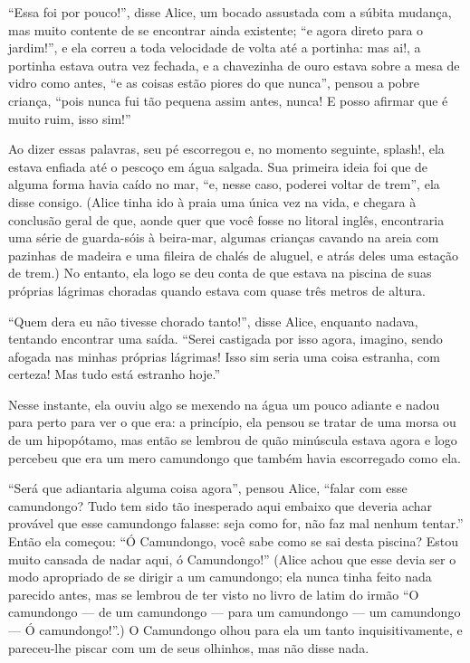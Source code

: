 ``Essa foi por pouco!'', disse Alice, um bocado assustada com a súbita
mudança, mas muito contente de se encontrar ainda existente; ``e agora
direto para o jardim!'', e ela correu a toda velocidade de volta até a
portinha: mas ai!, a portinha estava outra vez fechada, e a chavezinha
de ouro estava sobre a mesa de vidro como antes, ``e as coisas estão
piores do que nunca'', pensou a pobre criança, ``pois nunca fui tão
pequena assim antes, nunca! E posso afirmar que é muito ruim, isso
sim!''

Ao dizer essas palavras, seu pé escorregou e, no momento seguinte,
splash!, ela estava enfiada até o pescoço em água salgada. Sua primeira
ideia foi que de alguma forma havia caído no mar, ``e, nesse caso,
poderei voltar de trem'', ela disse consigo. (Alice tinha ido à praia
uma única vez na vida, e chegara à conclusão geral de que, aonde quer
que você fosse no litoral inglês, encontraria uma série de guarda-sóis à
beira-mar, algumas crianças cavando na areia com pazinhas de madeira e
uma fileira de chalés de aluguel, e atrás deles uma estação de trem.) No
entanto, ela logo se deu conta de que estava na piscina de suas próprias
lágrimas choradas quando estava com quase três metros de altura.

``Quem dera eu não tivesse chorado tanto!'', disse Alice, enquanto
nadava, tentando encontrar uma saída. ``Serei castigada por isso agora,
imagino, sendo afogada nas minhas próprias lágrimas! Isso sim seria uma
coisa estranha, com certeza! Mas tudo está estranho hoje.''

Nesse instante, ela ouviu algo se mexendo na água um pouco adiante e
nadou para perto para ver o que era: a princípio, ela pensou se tratar
de uma morsa ou de um hipopótamo, mas então se lembrou de quão minúscula
estava agora e logo percebeu que era um mero camundongo que também
havia escorregado como ela.

``Será que adiantaria alguma coisa agora'', pensou Alice, ``falar com
esse camundongo? Tudo tem sido tão inesperado aqui embaixo que deveria
achar provável que esse camundongo falasse: seja como for, não faz mal
nenhum tentar.'' Então ela começou: ``Ó Camundongo, você sabe como se
sai desta piscina? Estou muito cansada de nadar aqui, ó Camundongo!''
(Alice achou que esse devia ser o modo apropriado de se dirigir a um
camundongo; ela nunca tinha feito nada parecido antes, mas se lembrou de
ter visto no livro de latim do irmão ``O camundongo --- de um camundongo
--- para um camundongo --- um camundongo --- Ó camundongo!''.) O Camundongo
olhou para ela um tanto inquisitivamente, e pareceu-lhe piscar com um de
seus olhinhos, mas não disse nada.

